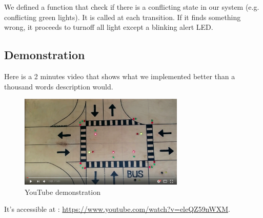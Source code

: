 We defined a function that check if there is a conflicting state in our system (e.g. conflicting green lights). It is called at each transition. If it finds something wrong, it proceeds to turnoff all light except a blinking alert LED.


\subsection{Demonstration}

Here is a 2 minutes video that shows what we implemented better than a thousand words description would.

\begin{figure}[H]\label{fig:ytv}
  \centering
    \includegraphics[width=0.7\textwidth]{picture/demo.png}
    \caption{YouTube demonstration}
\end{figure}

It's accessible at :  \url{https://www.youtube.com/watch?v=eleQZ59nWXM}.